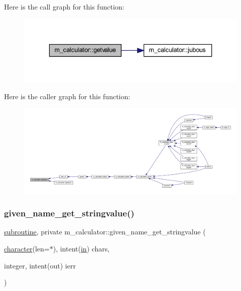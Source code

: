 Here is the call graph for this function\+:
\nopagebreak
\begin{figure}[H]
\begin{center}
\leavevmode
\includegraphics[width=336pt]{namespacem__calculator_ab8fa4f20b1e4db1b10ed4deb52b89b34_cgraph}
\end{center}
\end{figure}
Here is the caller graph for this function\+:
\nopagebreak
\begin{figure}[H]
\begin{center}
\leavevmode
\includegraphics[width=350pt]{namespacem__calculator_ab8fa4f20b1e4db1b10ed4deb52b89b34_icgraph}
\end{center}
\end{figure}
\mbox{\label{namespacem__calculator_a28e87f9e58861836dd6f7dec4bbb9311}} 
\subsubsection{\texorpdfstring{given\+\_\+name\+\_\+get\+\_\+stringvalue()}{given\_name\_get\_stringvalue()}}
{\footnotesize\ttfamily \hyperlink{M__stopwatch_83_8txt_acfbcff50169d691ff02d4a123ed70482}{subroutine}, private m\+\_\+calculator\+::given\+\_\+name\+\_\+get\+\_\+stringvalue (\begin{DoxyParamCaption}\item[{\hyperlink{option__stopwatch_83_8txt_abd4b21fbbd175834027b5224bfe97e66}{character}(len=$\ast$), intent(\hyperlink{M__journal_83_8txt_afce72651d1eed785a2132bee863b2f38}{in})}]{chars,  }\item[{integer, intent(out)}]{ierr }\end{DoxyParamCaption})\hspace{0.3cm}{\ttfamily [private]}}



